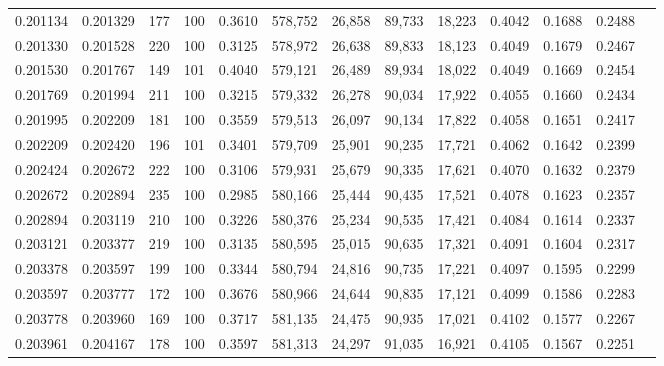 \begin{tabular}{rrrrrrrrrrrrr}
0.201134 & 0.201329 &   177 & 100 &                                     0.3610 & 578,752 &  26,858 &  89,733 &  18,223 & 0.4042 & 0.1688 & 0.2488 \\
0.201330 & 0.201528 &   220 & 100 &                                     0.3125 & 578,972 &  26,638 &  89,833 &  18,123 & 0.4049 & 0.1679 & 0.2467 \\
0.201530 & 0.201767 &   149 & 101 &                                     0.4040 & 579,121 &  26,489 &  89,934 &  18,022 & 0.4049 & 0.1669 & 0.2454 \\
0.201769 & 0.201994 &   211 & 100 &                                     0.3215 & 579,332 &  26,278 &  90,034 &  17,922 & 0.4055 & 0.1660 & 0.2434 \\
0.201995 & 0.202209 &   181 & 100 &                                     0.3559 & 579,513 &  26,097 &  90,134 &  17,822 & 0.4058 & 0.1651 & 0.2417 \\
0.202209 & 0.202420 &   196 & 101 &                                     0.3401 & 579,709 &  25,901 &  90,235 &  17,721 & 0.4062 & 0.1642 & 0.2399 \\
0.202424 & 0.202672 &   222 & 100 &                                     0.3106 & 579,931 &  25,679 &  90,335 &  17,621 & 0.4070 & 0.1632 & 0.2379 \\
0.202672 & 0.202894 &   235 & 100 &                                     0.2985 & 580,166 &  25,444 &  90,435 &  17,521 & 0.4078 & 0.1623 & 0.2357 \\
0.202894 & 0.203119 &   210 & 100 &                                     0.3226 & 580,376 &  25,234 &  90,535 &  17,421 & 0.4084 & 0.1614 & 0.2337 \\
0.203121 & 0.203377 &   219 & 100 &                                     0.3135 & 580,595 &  25,015 &  90,635 &  17,321 & 0.4091 & 0.1604 & 0.2317 \\
0.203378 & 0.203597 &   199 & 100 &                                     0.3344 & 580,794 &  24,816 &  90,735 &  17,221 & 0.4097 & 0.1595 & 0.2299 \\
0.203597 & 0.203777 &   172 & 100 &                                     0.3676 & 580,966 &  24,644 &  90,835 &  17,121 & 0.4099 & 0.1586 & 0.2283 \\
0.203778 & 0.203960 &   169 & 100 &                                     0.3717 & 581,135 &  24,475 &  90,935 &  17,021 & 0.4102 & 0.1577 & 0.2267 \\
0.203961 & 0.204167 &   178 & 100 &                                     0.3597 & 581,313 &  24,297 &  91,035 &  16,921 & 0.4105 & 0.1567 & 0.2251 \\

\end{tabular}
